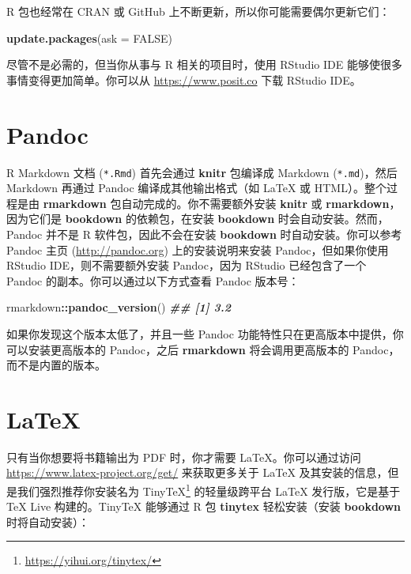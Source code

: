 \documentclass[
  12pt,
]{krantz}
\newenvironment{Shaded}{\begin{snugshade}}{\end{snugshade}}
\newcommand{\AttributeTok}[1]{\textcolor[rgb]{0.13,0.29,0.53}{#1}}
\newcommand{\ConstantTok}[1]{\textcolor[rgb]{0.56,0.35,0.01}{#1}}
\newcommand{\DocumentationTok}[1]{\textcolor[rgb]{0.56,0.35,0.01}{\textbf{\textit{#1}}}}
\newcommand{\FunctionTok}[1]{\textcolor[rgb]{0.13,0.29,0.53}{\textbf{#1}}}
\newcommand{\NormalTok}[1]{#1}
\newcommand{\SpecialCharTok}[1]{\textcolor[rgb]{0.81,0.36,0.00}{\textbf{#1}}}
\renewcommand{\href}[2]{#2\footnote{\url{#1}}}
\theoremstyle{definition}
\theoremstyle{definition}
\theoremstyle{definition}
\theoremstyle{definition}
\theoremstyle{remark}
\begin{document}
R 包也经常在 CRAN 或 GitHub 上不断更新，所以你可能需要偶尔更新它们：

\begin{Shaded}
\begin{Highlighting}[]
\FunctionTok{update.packages}\NormalTok{(}\AttributeTok{ask =} \ConstantTok{FALSE}\NormalTok{)}
\end{Highlighting}
\end{Shaded}

尽管不是必需的，但当你从事与 R 相关的项目时，使用 RStudio IDE 能够使很多事情变得更加简单。你可以从 \url{https://www.posit.co} 下载 RStudio IDE。

\section{Pandoc}\label{pandoc}

R Markdown 文档 (\texttt{*.Rmd}) 首先会通过 \textbf{knitr} 包编译成 Markdown (\texttt{*.md})，然后 Markdown 再通过 Pandoc 编译成其他输出格式（如 LaTeX 或 HTML）。整个过程是由 \textbf{rmarkdown} 包自动完成的。你不需要额外安装 \textbf{knitr} 或 \textbf{rmarkdown}，因为它们是 \textbf{bookdown} 的依赖包，在安装 \textbf{bookdown} 时会自动安装。然而，Pandoc 并不是 R 软件包，因此不会在安装 \textbf{bookdown} 时自动安装。你可以参考 Pandoc 主页 (\url{http://pandoc.org}) 上的安装说明来安装 Pandoc，但如果你使用 RStudio IDE，则不需要额外安装 Pandoc，因为 RStudio 已经包含了一个 Pandoc 的副本。你可以通过以下方式查看 Pandoc 版本号：

\begin{Shaded}
\begin{Highlighting}[]
\NormalTok{rmarkdown}\SpecialCharTok{::}\FunctionTok{pandoc\_version}\NormalTok{()}
\DocumentationTok{\#\# [1] \textquotesingle{}3.2\textquotesingle{}}
\end{Highlighting}
\end{Shaded}

如果你发现这个版本太低了，并且一些 Pandoc 功能特性只在更高版本中提供，你可以安装更高版本的 Pandoc，之后 \textbf{rmarkdown} 将会调用更高版本的 Pandoc，而不是内置的版本。

\section{LaTeX}\label{latex}

只有当你想要将书籍输出为 PDF 时，你才需要 LaTeX。你可以通过访问 \url{https://www.latex-project.org/get/} 来获取更多关于 LaTeX 及其安装的信息，但是我们强烈推荐你安装名为 \href{https://yihui.org/tinytex/}{TinyTeX} 的轻量级跨平台 LaTeX 发行版，它是基于 TeX Live 构建的。TinyTeX 能够通过 R 包 \textbf{tinytex} 轻松安装（安装 \textbf{bookdown} 时将自动安装）：
\end{document}
